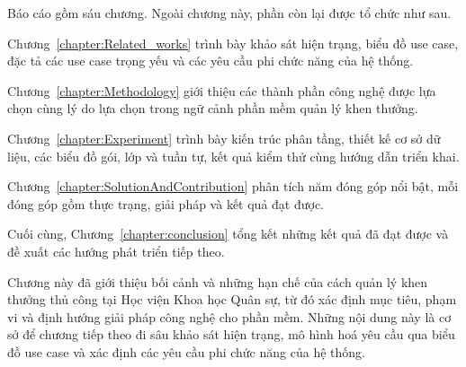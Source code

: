 \documentclass[../DoAn.tex]{subfiles}
\begin{document}
Báo cáo gồm sáu chương. Ngoài chương này, phần còn lại được tổ chức như sau.

Chương~\ref{chapter:Related_works} trình bày khảo sát hiện trạng, biểu đồ use case, đặc tả các use case trọng yếu và các yêu cầu phi chức năng của hệ thống.

Chương~\ref{chapter:Methodology} giới thiệu các thành phần công nghệ được lựa chọn cùng lý do lựa chọn trong ngữ cảnh phần mềm quản lý khen thưởng.

Chương~\ref{chapter:Experiment} trình bày kiến trúc phân tầng, thiết kế cơ sở dữ liệu, các biểu đồ gói, lớp và tuần tự, kết quả kiểm thử cùng hướng dẫn triển khai.

Chương~\ref{chapter:SolutionAndContribution} phân tích năm đóng góp nổi bật, mỗi đóng góp gồm thực trạng, giải pháp và kết quả đạt được.

Cuối cùng, Chương~\ref{chapter:conclusion} tổng kết những kết quả đã đạt được và đề xuất các hướng phát triển tiếp theo.

Chương này đã giới thiệu bối cảnh và những hạn chế của cách quản lý khen thưởng thủ công tại Học viện Khoa học Quân sự, từ đó xác định mục tiêu, phạm vi và định hướng giải pháp công nghệ cho phần mềm.
Những nội dung này là cơ sở để chương tiếp theo đi sâu khảo sát hiện trạng, mô hình hoá yêu cầu qua biểu đồ use case và xác định các yêu cầu phi chức năng của hệ thống.
\end{document}
